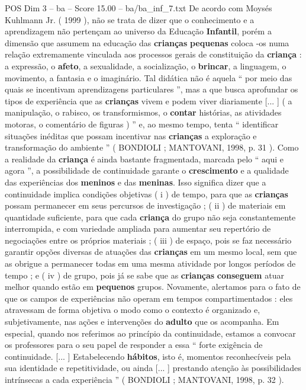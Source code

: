 \begin{textsample}{POS Dim 3 – ba – Score 15.00 – ba/ba\_inf\_7.txt}
De acordo com Moysés Kuhlmann Jr. ( 1999 ), não se trata de dizer que o conhecimento e a aprendizagem não pertençam ao universo da Educação \textbf{Infantil}, porém a dimensão que assumem na educação das \textbf{crianças} \textbf{pequenas} coloca -os numa relação extremamente vinculada aos processos gerais de constituição da \textbf{criança} : a expressão, o \textbf{afeto}, a sexualidade, a socialização, o \textbf{brincar}, a linguagem, o movimento, a fantasia e o imaginário.
Tal didática não é aquela “ por meio das quais se incentivam aprendizagens particulares ”, mas a que busca aprofundar os tipos de experiência que as \textbf{crianças} vivem e podem viver diariamente [... ] ( a manipulação, o rabisco, os transformismos, o \textbf{contar} histórias, as atividades motoras, o comentário de figuras ) ” e, ao mesmo tempo, tenta “ identificar situações inéditas que possam incentivar nas \textbf{crianças} a exploração e transformação do ambiente ” ( BONDIOLI ; MANTOVANI, 1998, p. 31 ).
Como a realidade da \textbf{criança} é ainda bastante fragmentada, marcada pelo “ aqui e agora ”, a possibilidade de continuidade garante o \textbf{crescimento} e a qualidade das experiências dos \textbf{meninos} e das \textbf{meninas}.
Isso significa dizer que a continuidade implica condições objetivas ( i ) de tempo, para que as \textbf{crianças} possam permanecer em seus percursos de investigação ; ( ii ) de materiais em quantidade suficiente, para que cada \textbf{criança} do grupo não seja constantemente interrompida, e com variedade ampliada para aumentar seu repertório de negociações entre os próprios materiais ; ( iii ) de espaço, pois se faz necessário garantir opções diversas de atuações das \textbf{crianças} em um mesmo local, sem que as obrigue a permanecer todas em uma mesma atividade por longos períodos de tempo ; e ( iv ) de grupo, pois já se sabe que as \textbf{crianças} \textbf{conseguem} atuar melhor quando estão em \textbf{pequenos} grupos.
Novamente, alertamos para o fato de que os campos de experiências não operam em tempos compartimentados : eles atravessam de forma objetiva o modo como o contexto é organizado e, subjetivamente, nas ações e intervenções do \textbf{adulto} que os acompanha.
Em especial, quando nos referimos ao princípio da continuidade, estamos a convocar os professores para o seu papel de responder a essa “ forte exigência de continuidade. [... ] Estabelecendo \textbf{hábitos}, isto é, momentos reconhecíveis pela sua identidade e repetitividade, ou ainda [... ] prestando atenção às possibilidades intrínsecas a cada experiência ” ( BONDIOLI ; MANTOVANI, 1998, p. 32 ).

\end{textsample}
